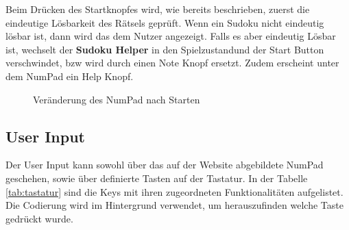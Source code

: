 Beim Drücken des Startknopfes wird, wie bereits beschrieben, zuerst die eindeutige Lösbarkeit des Rätsels geprüft. Wenn ein Sudoku nicht eindeutig lösbar ist, dann wird das dem Nutzer angezeigt. Falls es aber eindeutig Lösbar ist, wechselt der \textbf{Sudoku Helper} in den \glqq Spielzustand\grqq und der Start Button verschwindet, bzw wird durch einen Note Knopf ersetzt. Zudem erscheint unter dem NumPad ein Help Knopf. 



\begin{figure}[H]
	\centering
	\qquad
	\caption{Veränderung des NumPad nach Starten}%
\end{figure}

\subsection{User Input}

Der User Input kann sowohl über das auf der Website abgebildete NumPad geschehen, sowie über definierte Tasten auf der Tastatur. In der Tabelle \ref{tab:tastatur} sind die Keys mit ihren zugeordneten Funktionalitäten aufgelistet. Die Codierung wird im Hintergrund verwendet, um herauszufinden welche Taste gedrückt wurde.


